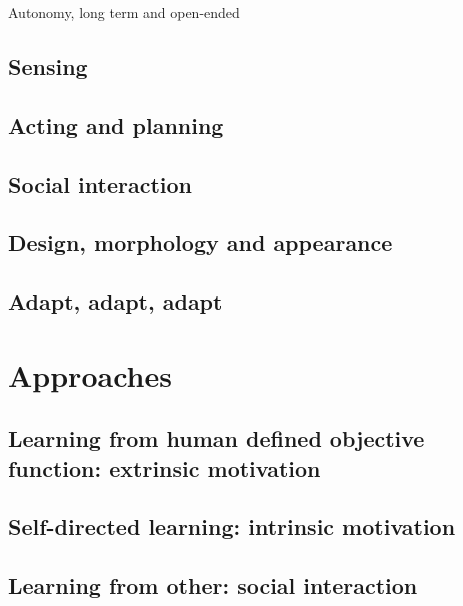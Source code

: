 Autonomy, long term and open-ended

\subsection{Sensing}

\subsection{Acting and planning}

\subsection{Social interaction}

\subsection{Design, morphology and appearance}

\subsection{Adapt, adapt, adapt}

\section{Approaches}

\subsection{Learning from human defined objective function: extrinsic motivation}

\subsection{Self-directed learning: intrinsic motivation}

\subsection{Learning from other: social interaction}

